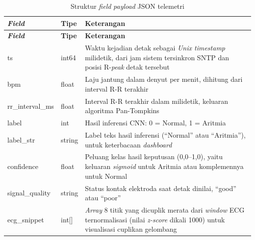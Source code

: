 \begin{center}
  \setlength{\tabcolsep}{4pt}
  \renewcommand{\arraystretch}{1.15}
  \small
  \begin{longtable}{p{3.6cm}p{2.0cm}p{7.4cm}}
    \caption{Struktur \textit{field} \textit{payload} JSON telemetri}
    \label{tab:payload-json} \\
    \toprule
    \textbf{\textit{Field}} &
    \textbf{Tipe} &
    \textbf{Keterangan} \\
    \midrule
    \endfirsthead
    \toprule
    \textbf{\textit{Field}} &
    \textbf{Tipe} &
    \textbf{Keterangan} \\
    \midrule
    \endhead
    \bottomrule
    \endfoot
    ts &
    int64 &
    Waktu kejadian detak sebagai \textit{Unix timestamp} milidetik, dari jam
    sistem tersinkron SNTP dan posisi R-\textit{peak} detak tersebut \\
    bpm &
    float &
    Laju jantung dalam denyut per menit, dihitung dari interval R-R
    terakhir \\
    rr\_interval\_ms &
    float &
    Interval R-R terakhir dalam milidetik, keluaran algoritma
    Pan-Tompkins \\
    label &
    int &
    Hasil inferensi CNN: 0 = Normal, 1 = Aritmia \\
    label\_str &
    string &
    Label teks hasil inferensi (``Normal'' atau
    ``Aritmia''), untuk keterbacaan \textit{dashboard} \\
    confidence &
    float &
    Peluang kelas hasil keputusan (0,0--1,0), yaitu keluaran
    \textit{sigmoid} untuk Aritmia atau komplemennya untuk Normal \\
    signal\_quality &
    string &
    Status kontak elektroda saat detak dinilai, ``good'' atau ``poor'' \\
    ecg\_snippet &
    int[] &
    \textit{Array} 8 titik yang dicuplik merata dari \textit{window}
    ECG ternormalisasi (nilai \textit{z-score} dikali 1000) untuk
    visualisasi cuplikan gelombang \\

\end{longtable}
\end{center}
